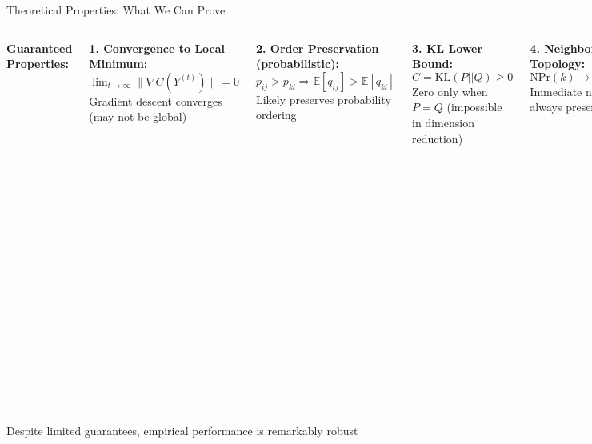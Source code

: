 \documentclass[aspectratio=169]{beamer}
\begin{document}
\begin{frame}{Theoretical Properties: What We Can Prove}
\begin{columns}
\textbf{Guaranteed Properties:}

\textbf{1. Convergence to Local Minimum:}
$\lim_{t\to\infty} \|\nabla C(Y^{(t)})\| = 0$
Gradient descent converges (may not be global)

\textbf{2. Order Preservation (probabilistic):}
$p_{ij} > p_{kl} \Rightarrow \mathbb{E}[q_{ij}] > \mathbb{E}[q_{kl}]$
Likely preserves probability ordering

\textbf{3. KL Lower Bound:}
$C = \text{KL}(P||Q) \geq 0$
Zero only when $P = Q$ (impossible in dimension reduction)

\textbf{4. Neighborhood Topology:}
$\text{NPr}(k) \to 1 \text{ as } k \to 0$
Immediate neighbors always preserved

\textbf{NOT Guaranteed:}

\begin{itemize}
\item Global optimum (NP-hard)
\item Distance preservation beyond neighborhoods
\item Linear separability maintenance
\item Unique solution (stochastic)
\item Cluster number preservation
\item Convex cluster shapes
\end{itemize}

\vspace{0.3cm}
\end{columns}

\vspace{0.3cm}
\colorbox{green!20}{\parbox{0.95\textwidth}{\centering Despite limited guarantees, empirical performance is remarkably robust}}
\end{frame}
\end{document}
